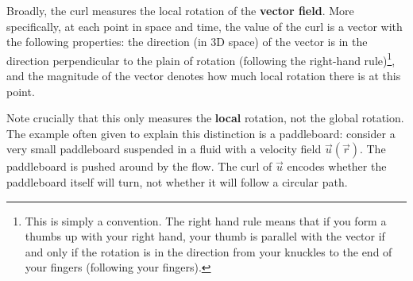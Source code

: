 Broadly, the curl measures the local rotation of the \textbf{vector field}. More specifically, at each point in space and time, the value of the curl is a vector with the following properties: the direction (in 3D space) of the vector is in the direction perpendicular to the plain of rotation (following the right-hand rule)\footnote{This is simply a convention. The right hand rule means that if you form a thumbs up with your right hand, your thumb is parallel with the vector if and only if the rotation is in the direction from your knuckles to the end of your fingers (following your fingers).}, and the magnitude of the vector denotes how much local rotation there is at this point.

Note crucially that this only measures the \textbf{local} rotation, not the global rotation. The example often given to explain this distinction is a paddleboard: consider a very small paddleboard suspended in a fluid with a velocity field $\vec{u}(\vec{r})$. The paddleboard is pushed around by the flow. The curl of $\vec{u}$ encodes whether the paddleboard itself will turn, not whether it will follow a circular path.

